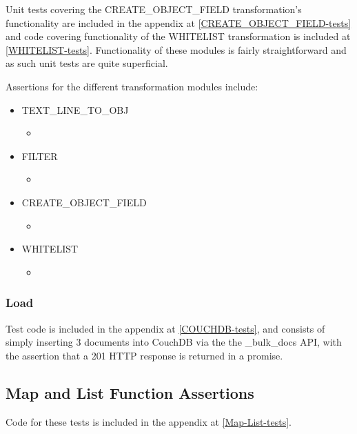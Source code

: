Unit tests covering the CREATE\_OBJECT\_FIELD transformation's functionality are included in the appendix at \ref{CREATE_OBJECT_FIELD-tests} and code covering functionality of the WHITELIST transformation is included at \ref{WHITELIST-tests}. Functionality of these modules is fairly straightforward and as such unit tests are quite superficial.

Assertions for the different transformation modules include:

\begin{itemize}
    \item TEXT\_LINE\_TO\_OBJ
          \begin{itemize}
              \item
          \end{itemize}
    \item FILTER
          \begin{itemize}
              \item
          \end{itemize}
    \item CREATE\_OBJECT\_FIELD
          \begin{itemize}
              \item
          \end{itemize}
    \item WHITELIST
          \begin{itemize}
              \item
          \end{itemize}
\end{itemize}

\subsubsection{Load}
Test code is included in the appendix at \ref{COUCHDB-tests}, and consists of simply inserting 3 documents into CouchDB via the the \_bulk\_docs API, with the assertion that a 201 HTTP response is returned in a promise.

\subsection{Map and List Function Assertions}
Code for these tests is included in the appendix at \ref{Map-List-tests}.